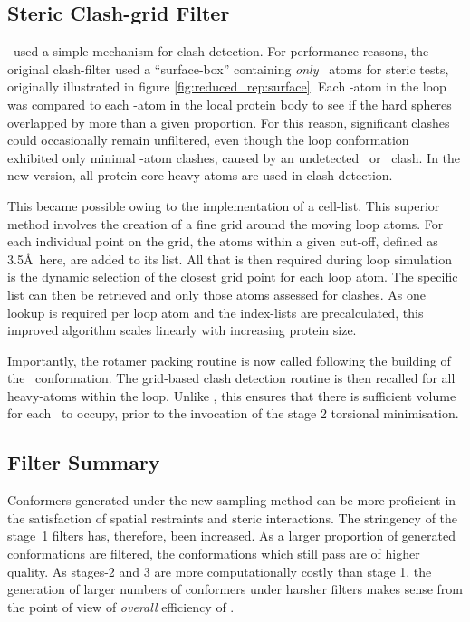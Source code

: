 \subsection{Steric Clash-grid Filter}
\label{section:arcus:clashGridFilter}

\prearcus\ used a simple mechanism for clash detection. For performance reasons, the original clash-filter used a ``surface-box'' containing \emph{only} \ca\ atoms for steric tests, originally illustrated in figure \ref{fig:reduced_rep:surface}.
Each \ca-atom in the loop was compared to each \mbox{\ca-atom} in the local protein body to see if the hard spheres overlapped by more than a given proportion. For this reason, significant clashes could occasionally remain unfiltered, even though the loop conformation exhibited only minimal \ca-atom clashes, caused by an undetected \mainchain\ or \sidechain\ clash. In the new version,
all protein core heavy-atoms are used in clash-detection.

This became possible owing to the implementation of a cell-list.
This superior method involves the creation of a fine grid around the moving loop atoms. For each individual point on the grid, the atoms within a given cut-off, defined as 3.5\AA\ here, are added to its list. All that is then required during loop simulation is the dynamic selection of the closest grid point for each loop atom. The specific list can then be retrieved and only those atoms assessed for clashes. As one lookup is required per loop atom and the index-lists are precalculated, this improved algorithm scales linearly with increasing protein size.

Importantly, the rotamer packing routine is now called following the building of the \mainchain\ conformation.
The grid-based clash detection routine is then recalled for all heavy-atoms within the loop. Unlike \prearcus, this ensures that there is sufficient volume for each \sidechain\ to occupy, prior to the invocation of the stage 2 torsional minimisation.
\subsection{Filter Summary}

Conformers generated under the new sampling method can be more proficient in the satisfaction of spatial restraints and steric interactions. The stringency of the \mbox{stage 1} filters has, therefore, been increased. As a larger proportion of generated conformations are filtered, the conformations which still pass are of higher quality. As stages-2 and 3 are more computationally costly than stage 1, the generation of larger numbers of conformers under harsher filters makes sense from the point of view of \emph{overall} efficiency of \arcus. 

